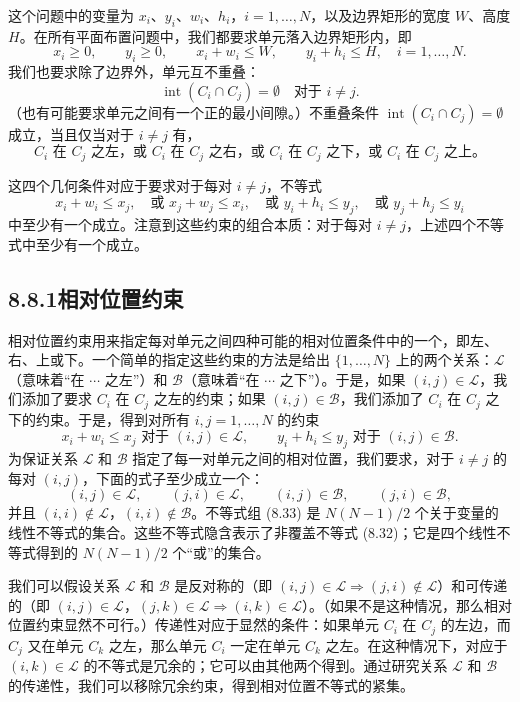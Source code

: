 \documentclass[UTF8, 12pt, fontset=fandol, oneside]{ctexart}
\begin{document}
这个问题中的变量为 $x_i$、$y_i$、$w_i$、$h_i$，$i=1,\ldots,N$，以及边界矩形的宽度 $W$、高度 $H$。在所有平面布置问题中，我们都要求单元落入边界矩形内，即
\[
x_i\geq 0,\qquad y_i\geq 0,\qquad x_i+w_i\leq W,\qquad y_i+h_i\leq H,\quad i=1,\ldots,N.
\tag{8.31}
\]
我们也要求除了边界外，单元互不重叠：
\[
\operatorname{int}(C_i\cap C_j)=\emptyset \quad \mbox{对于 } i\neq j.
\]
（也有可能要求单元之间有一个正的最小间隙。）不重叠条件 $\operatorname{int}(C_i\cap C_j)=\emptyset$ 成立，当且仅当对于 $i\neq j$ 有，
\[
C_i\mbox{ 在 }C_j\mbox{ 之左，或 }C_i\mbox{ 在 }C_j\mbox{ 之右，或 }C_i\mbox{ 在 }C_j\mbox{ 之下，或 }C_i\mbox{ 在 }C_j\mbox{ 之上。}
\]

这四个几何条件对应于要求对于每对 $i\neq j$，不等式
\[
x_i+w_i\leq x_j,\quad \mbox{或 } x_j+w_j\leq x_i,\quad \mbox{或 } y_i+h_i\leq y_j,\quad \mbox{或 } y_j+h_j\leq y_i
\tag{8.32}
\]
中至少有一个成立。注意到这些约束的组合本质：对于每对 $i\neq j$，上述四个不等式中至少有一个成立。

\subsection*{8.8.1\quad 相对位置约束}

相对位置约束用来指定每对单元之间四种可能的相对位置条件中的一个，即左、右、上或下。一个简单的指定这些约束的方法是给出 $\{1,\ldots,N\}$ 上的两个关系：$\mathcal L$（意味着“在 $\cdots$ 之左”）和 $\mathcal B$（意味着“在 $\cdots$ 之下”）。于是，如果 $(i,j)\in\mathcal L$，我们添加了要求 $C_i$ 在 $C_j$ 之左的约束；如果 $(i,j)\in\mathcal B$，我们添加了 $C_i$ 在 $C_j$ 之下的约束。于是，得到对所有 $i,j=1,\ldots,N$ 的约束
\[
x_i+w_i\leq x_j \mbox{ 对于 } (i,j)\in\mathcal L,\qquad
y_i+h_i\leq y_j \mbox{ 对于 } (i,j)\in\mathcal B.
\tag{8.33}
\]
为保证关系 $\mathcal L$ 和 $\mathcal B$ 指定了每一对单元之间的相对位置，我们要求，对于 $i\neq j$ 的每对 $(i,j)$，下面的式子至少成立一个：
\[
(i,j)\in\mathcal L,\qquad (j,i)\in\mathcal L,\qquad (i,j)\in\mathcal B,\qquad (j,i)\in\mathcal B,
\]
并且 $(i,i)\notin\mathcal L$，$(i,i)\notin\mathcal B$。不等式组 (8.33) 是 $N(N-1)/2$ 个关于变量的线性不等式的集合。这些不等式隐含表示了非覆盖不等式 (8.32)；它是四个线性不等式得到的 $N(N-1)/2$ 个“或”的集合。

我们可以假设关系 $\mathcal L$ 和 $\mathcal B$ 是反对称的（即 $(i,j)\in\mathcal L\Rightarrow (j,i)\notin\mathcal L$）和可传递的（即 $(i,j)\in\mathcal L$，$(j,k)\in\mathcal L\Rightarrow (i,k)\in\mathcal L$）。（如果不是这种情况，那么相对位置约束显然不可行。）传递性对应于显然的条件：如果单元 $C_i$ 在 $C_j$ 的左边，而 $C_j$ 又在单元 $C_k$ 之左，那么单元 $C_i$ 一定在单元 $C_k$ 之左。在这种情况下，对应于 $(i,k)\in\mathcal L$ 的不等式是冗余的；它可以由其他两个得到。通过研究关系 $\mathcal L$ 和 $\mathcal B$ 的传递性，我们可以移除冗余约束，得到相对位置不等式的紧集。
\end{document}
